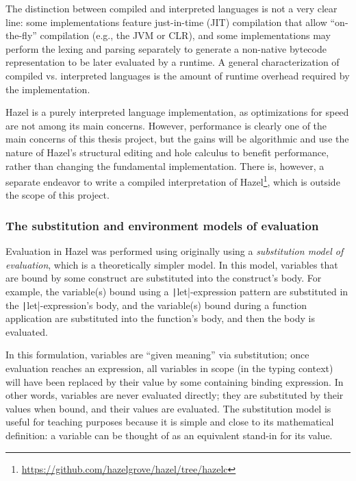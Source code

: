The distinction between compiled and interpreted languages is not a very clear line: some implementations feature just-in-time (JIT) compilation that allow ``on-the-fly'' compilation (e.g., the JVM or CLR), and some implementations may perform the lexing and parsing separately to generate a non-native bytecode representation to be later evaluated by a runtime. A general characterization of compiled vs. interpreted languages is the amount of runtime overhead required by the implementation.

Hazel is a purely interpreted language implementation, as optimizations for speed are not among its main concerns. However, performance is clearly one of the main concerns of this thesis project, but the gains will be algorithmic and use the nature of Hazel's structural editing and hole calculus to benefit performance, rather than changing the fundamental implementation. There is, however, a separate endeavor to write a compiled interpretation of Hazel\footnote{\url{https://github.com/hazelgrove/hazel/tree/hazelc}}, which is outside the scope of this project.

\subsubsection{The substitution and environment models of evaluation}
\label{sec:sub_vs_eval}



Evaluation in Hazel was performed using originally using a \textit{substitution model of evaluation}, which is a theoretically simpler model. In this model, variables that are bound by some construct are substituted into the construct's body. For example, the variable(s) bound using a \texttt|let|-expression pattern are substituted in the \texttt|let|-expression's body, and the variable(s) bound during a function application are substituted into the function's body, and then the body is evaluated.


In this formulation, variables are ``given meaning'' via substitution; once evaluation reaches an expression, all variables in scope (in the typing context) will have been replaced by their value by some containing binding expression. In other words, variables are never evaluated directly; they are substituted by their values when bound, and their values are evaluated. The substitution model is useful for teaching purposes because it is simple and close to its mathematical definition: a variable can be thought of as an equivalent stand-in for its value.

